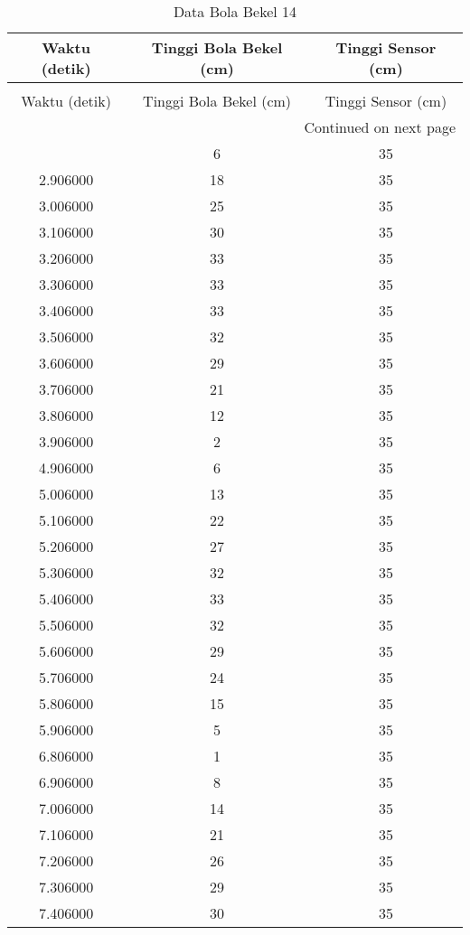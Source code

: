 \begin{longtable}[htbp]{|c|c|c|}
\caption{Data Bola Bekel 14} \\
\hline
Waktu (detik) & Tinggi Bola Bekel (cm) & Tinggi Sensor (cm) \\ \hline
\endfirsthead
\caption[]{Data Bola Bekel 14} \\
\hline
Waktu (detik) & Tinggi Bola Bekel (cm) & Tinggi Sensor (cm) \\ \hline
\endhead
\multicolumn{3}{r}{Continued on next page} \\
\endfoot
\endlastfoot
2.806000 & 6 & 35 \\ \hline
2.906000 & 18 & 35 \\ \hline
3.006000 & 25 & 35 \\ \hline
3.106000 & 30 & 35 \\ \hline
3.206000 & 33 & 35 \\ \hline
3.306000 & 33 & 35 \\ \hline
3.406000 & 33 & 35 \\ \hline
3.506000 & 32 & 35 \\ \hline
3.606000 & 29 & 35 \\ \hline
3.706000 & 21 & 35 \\ \hline
3.806000 & 12 & 35 \\ \hline
3.906000 & 2 & 35 \\ \hline
4.906000 & 6 & 35 \\ \hline
5.006000 & 13 & 35 \\ \hline
5.106000 & 22 & 35 \\ \hline
5.206000 & 27 & 35 \\ \hline
5.306000 & 32 & 35 \\ \hline
5.406000 & 33 & 35 \\ \hline
5.506000 & 32 & 35 \\ \hline
5.606000 & 29 & 35 \\ \hline
5.706000 & 24 & 35 \\ \hline
5.806000 & 15 & 35 \\ \hline
5.906000 & 5 & 35 \\ \hline
6.806000 & 1 & 35 \\ \hline
6.906000 & 8 & 35 \\ \hline
7.006000 & 14 & 35 \\ \hline
7.106000 & 21 & 35 \\ \hline
7.206000 & 26 & 35 \\ \hline
7.306000 & 29 & 35 \\ \hline
7.406000 & 30 & 35 \\ \hline

\end{longtable}
